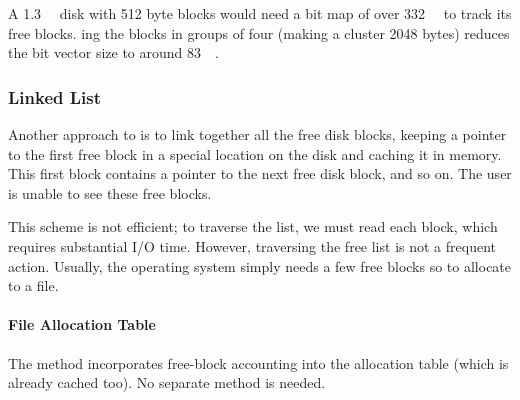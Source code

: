 A \SI{1.3}{\gibi{} \byte{}} disk with 512 byte blocks would need a bit map of over \SI{332}{\kibi{} \byte{}} to track its free blocks.
ing the blocks in groups of four (making a cluster 2048 bytes) reduces the bit vector size to around \SI{83}{\kibi{} \byte{}}.

\subsubsection{Linked List}\label{subsubsec:Free_Space_Linked_List}
Another approach to  is to link together all the free disk blocks, keeping a pointer to the first free block in a special location on the disk and caching it in memory.
This first block contains a pointer to the next free disk block, and so on.
The user is unable to see these free blocks.

This scheme is not efficient; to traverse the list, we must read each block, which requires substantial I/O time.
However, traversing the free list is not a frequent action.
Usually, the operating system simply needs a few free blocks so to allocate to a file.

\paragraph{File Allocation Table}\label{par:FAT_Free_Space}
The  method incorporates free-block accounting into the allocation table (which is already cached too).
No separate method is needed.


